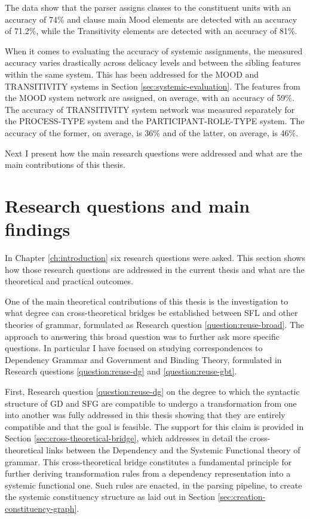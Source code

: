     The data show that the parser assigns classes to the constituent units with an accuracy of 74\% and clause main Mood elements are detected with an accuracy of 71.2\%, while the Transitivity elements are detected with an accuracy of 81\%. 
    
    When it comes to evaluating the accuracy of systemic assignments, the measured accuracy varies drastically across delicacy levels and between the sibling features within the same system. This has been addressed for the MOOD and TRANSITIVITY systems in Section \ref{sec:systemic-evaluation}. The features from the MOOD system network are assigned, on average, with an accuracy of 59\%. The accuracy of TRANSITIVITY system network was measured separately for the PROCESS-TYPE system and the PARTICIPANT-ROLE-TYPE system. The accuracy of the former, on average, is 36\% and of the latter, on average, is 46\%. 

    Next I present how the main research questions were addressed and what are the main contributions of this thesis.
    

\section{Research questions and main findings}
    In Chapter \ref{ch:introduction} six research questions were asked. This section shows how those research questions are addressed in the current thesis and what are the theoretical and practical outcomes.
    
    One of the main theoretical contributions of this thesis is the investigation to what degree can cross-theoretical bridges be established between SFL and other theories of grammar, formulated as Research question \ref{question:reuse-broad}. 
    The approach to answering this broad question was to further ask more specific questions. In particular I have focused on studying correspondences to Dependency Grammar and Government and Binding Theory, formulated in Research questions \ref{question:reuse-dg} and \ref{question:reuse-gbt}. 

    First, Research question \ref{question:reuse-dg} on the degree to which the syntactic structure of GD and SFG are compatible to undergo a transformation from one into another was fully addressed in this thesis showing that they are entirely compatible and that the goal is feasible. The support for this claim is provided in Section \ref{sec:cross-theoretical-bridge}, which addresses in detail the cross-theoretical links between the Dependency and the Systemic Functional theory of grammar. This cross-theoretical bridge constitutes a fundamental principle for further deriving transformation rules from a dependency representation into a systemic functional one. Such rules are enacted, in the parsing pipeline, to create the systemic constituency structure as laid out in Section \ref{sec:creation-constituency-graph}. 
    
